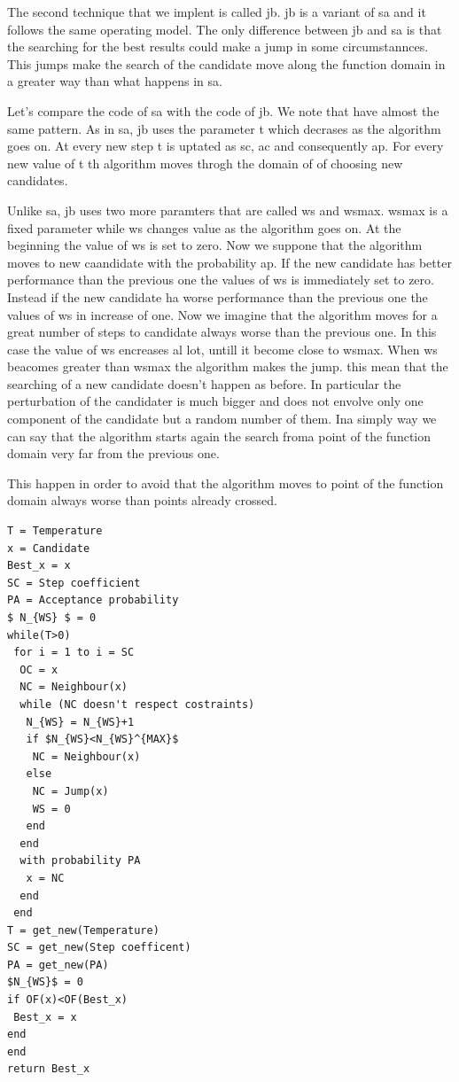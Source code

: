 \documentclass[journal]{IEEEtran}
\begin{document}
The second technique that we implent is called \gls{jb}. \gls{jb} is a variant of \gls{sa} and it follows the same operating model. The only difference between \gls{jb} and \gls{sa} is that the searching for the best results could make a jump in some circumstannces. This jumps make the search of the candidate move along the function domain in a greater way than what happens in \gls{sa}.

Let's compare the code of \gls{sa} with the code of \gls{jb}. We note that have almost the same pattern. As in \gls{sa}, \gls{jb} uses the parameter \gls{t} which decrases as the algorithm goes on. At every new step \gls{t} is uptated as \gls{sc}, \gls{ac} and consequently \gls{ap}. For every new value of \gls{t} th algorithm moves throgh the domain of \gls{of} choosing new candidates.

Unlike \gls{sa}, \gls{jb} uses two more paramters that are called \gls{ws} and \gls{wsmax}. \gls{wsmax} is a fixed parameter while \gls{ws} changes value as the algorithm goes on. At the beginning the value of \gls{ws} is set to zero. Now we suppone that the algorithm moves to new caandidate with the probability \gls{ap}. If the new candidate has better performance than the previous one the values of \gls{ws} is immediately set to zero. Instead if the new candidate ha worse performance than the previous one the values of \gls{ws} in increase of one. Now we imagine that the algorithm moves for a great number of steps to candidate always worse than the previous one. In this case the value of \gls{ws} encreases al lot, untill it become close to \gls{wsmax}. When \gls{ws} beacomes greater than \gls{wsmax} the algorithm makes the jump. this mean that the searching of a new candidate doesn't happen as before. In particular the perturbation of the candidater is much bigger and does not envolve only one component of the candidate but a random number of them. Ina simply way we can say that the algorithm starts again the search froma point of the function domain very far from the previous one.

This happen in order to avoid that the algorithm moves to point of the function domain always worse than points already crossed.

\pagebreak

\begin{lstlisting}[mathescape=true,frame=single]
T = Temperature
x = Candidate
Best_x = x
SC = Step coefficient
PA = Acceptance probability
$ N_{WS} $ = 0
while(T>0)
 for i = 1 to i = SC
  OC = x
  NC = Neighbour(x)
  while (NC doesn't respect costraints)
   N_{WS} = N_{WS}+1
   if $N_{WS}<N_{WS}^{MAX}$
    NC = Neighbour(x)
   else
    NC = Jump(x)
    WS = 0
   end
  end
  with probability PA
   x = NC
  end
 end
T = get_new(Temperature)
SC = get_new(Step coefficent)
PA = get_new(PA)
$N_{WS}$ = 0
if OF(x)<OF(Best_x)
 Best_x = x
end
end
return Best_x
\end{lstlisting} 
\end{document}
